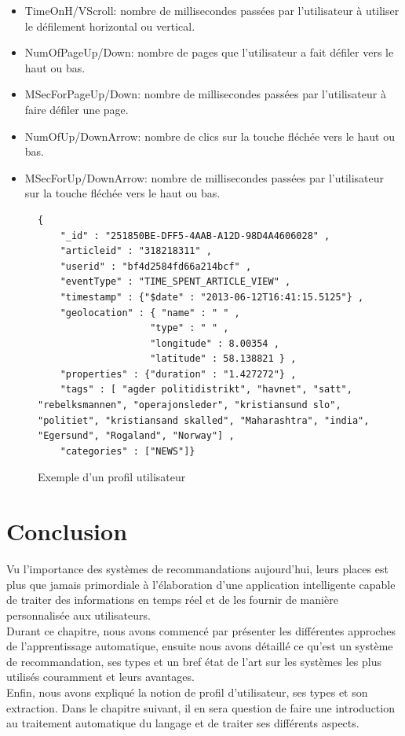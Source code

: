 \begin{itemize}
    \item TimeOnH/VScroll: nombre de millisecondes passées par l'utilisateur à utiliser le défilement horizontal ou vertical.
    \item NumOfPageUp/Down: nombre de pages que l'utilisateur a fait défiler vers le haut ou bas.
    \item MSecForPageUp/Down: nombre de millisecondes passées par l'utilisateur à faire défiler une page.
    \item NumOfUp/DownArrow: nombre de clics sur la touche fléchée vers le haut ou bas.
    \item MSecForUp/DownArrow: nombre de millisecondes passées par l'utilisateur sur la touche fléchée vers le haut ou bas.\cite{profil}
\end{itemize}

\begin{figure}[H]
\begin{lstlisting}[style=code]
    {
    "_id" : "251850BE-DFF5-4AAB-A12D-98D4A4606028" ,
    "articleid" : "318218311" ,
    "userid" : "bf4d2584fd66a214bcf" ,
    "eventType" : "TIME_SPENT_ARTICLE_VIEW" ,
    "timestamp" : {"$date" : "2013-06-12T16:41:15.5125"} ,
    "geolocation" : { "name" : " " ,
                    "type" : " " ,
                    "longitude" : 8.00354 ,
                    "latitude" : 58.138821 } ,
    "properties" : {"duration" : "1.427272"} ,
    "tags" : [ "agder politidistrikt", "havnet", "satt", "rebelksmannen", "operajonsleder", "kristiansund slo", "politiet", "kristiansand skalled", "Maharashtra", "india", "Egersund", "Rogaland", "Norway"] ,
    "categories" : ["NEWS"]}
\end{lstlisting}
\caption{Exemple d'un profil utilisateur}
\end{figure}

\section{Conclusion}
Vu l'importance des systèmes de recommandations aujourd'hui, leurs places est plus que jamais primordiale à l'élaboration d'une application intelligente capable de traiter des informations en temps réel et de les fournir de manière personnalisée aux utilisateurs.\\
Durant ce chapitre, nous avons commencé par présenter les différentes approches de l'apprentissage automatique, ensuite nous avons détaillé ce qu'est un système de recommandation, ses types et un bref état de l'art sur les systèmes les plus utilisés couramment et leurs avantages.\\ 
Enfin, nous avons expliqué la notion de profil d'utilisateur, ses types et son extraction. Dans le chapitre suivant, il en sera question de faire une introduction au traitement automatique du langage et de traiter ses différents aspects.